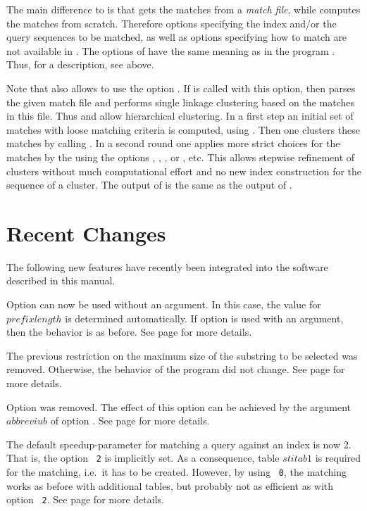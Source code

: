 \documentclass[12pt,titlepage]{article}
\makeatletter
\newcommand{\TTindex}[1]{\index{#1@\texttt{#1}}}
\newcommand{\STIone}[0]{\mathit{stitab1}}
\newcommand{\Prefixlength}[0]{\mathit{prefixlength}}
\newcommand{\Recentdetails}[1]{See page \pageref{#1} for more details\xspace}
\makeatother
\begin{document}
The main difference to \VM is that \VMS gets the matches
from a \emph{match file}, while \VM computes the matches from scratch. 
Therefore
options specifying the index and/or the query sequences to be matched,
as well as options specifying how to match are not available in \VMS. 
The options of \VMS have the same meaning as in the program \VM. Thus, for a 
description, see above. 

Note that \VMS also allows to use the option . 
If \VMS is called with this option, then parses the given match file
and performs single linkage clustering based on the matches in this file. 
Thus \VM and \VMS allow hierarchical clustering.
In a first step an initial set of matches with loose
matching criteria is computed, using \VM. Then one clusters these matches 
by calling \VMS. In a second round one applies more strict choices for 
the matches by the using the options , ,
, or , etc. This allows
stepwise refinement of clusters without much computational effort and
no new index construction for the sequence of a cluster.
The output of \VMS is the same as the output of \VM.

\section{Recent Changes}
The following new features have recently been integrated into the
software described in this manual.

Option  can now be used without an argument. In this case,
the value for \(\Prefixlength\) is determined automatically. If option
 is used with an argument, then the behavior is as
before. \Recentdetails{PLoption}.

The previous restriction on the maximum size of the substring to
be selected was removed. Otherwise, the behavior of the program
did not change. \Recentdetails{VSSS}.

\begin{AboutVmatch}

Option  was removed. The effect of this option
can be achieved by the argument $\mathit{abbreviub}$ of option 
.\TTindex{abbreviub}
\Recentdetails{IUBABBREV}.

The default speedup-parameter for matching a query against an
index is now 2. That is, the option ~\texttt{2}
is implicitly set. As a consequence, table $\STIone$ is required
for the matching, i.e.\ it has to be created. However, by using
~\texttt{0}, the matching works as before
with additional tables, but probably not as efficient as with
option ~\texttt{2}.
\Recentdetails{QSPEEDUPoption}.

\end{AboutVmatch}
\end{document}
